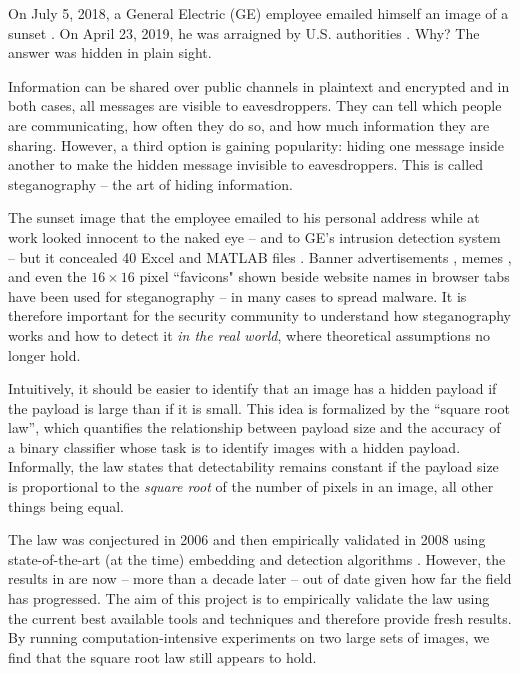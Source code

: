 \documentclass[11pt,a4paper,twoside,openright]{report}
\begin{document}
On July 5, 2018, a General Electric (GE) employee emailed himself an image of a sunset \cite{info-sec-ge}. On April 23, 2019, he was arraigned by U.S. authorities \cite{washington-post-ge}. Why? The answer was hidden in plain sight.

Information can be shared over public channels in plaintext and encrypted and in both cases, all messages are visible to eavesdroppers. They can tell which people are communicating, how often they do so, and how much information they are sharing. However, a third option is gaining popularity: hiding one message inside another to make the hidden message invisible to eavesdroppers. This is called steganography -- the art of hiding information.

The sunset image that the employee emailed to his personal address while at work looked innocent to the naked eye -- and to GE's intrusion detection system -- but it concealed 40 Excel and MATLAB files \cite{info-sec-ge}. Banner advertisements \cite{forbes-banner-ads}, memes \cite{trend-micro-memes}, and even the $16\times16$ pixel ``favicons" shown beside website names in browser tabs \cite{trend-micro-steganography} have been used for steganography -- in many cases to spread malware. It is therefore important for the security community to understand how steganography works and how to detect it \textit{in the real world}, where theoretical assumptions no longer hold.

Intuitively, it should be easier to identify that an image has a hidden payload if the payload is large than if it is small. This idea is formalized by the ``square root law'', which quantifies the relationship between payload size and the accuracy of a binary classifier whose task is to identify images with a hidden payload. Informally, the law states that detectability remains constant if the payload size is proportional to the \textit{square root} of the number of pixels in an image, all other things being equal.

The law was conjectured in 2006 \cite{batch-first-srl} and then empirically validated in 2008 using state-of-the-art (at the time) embedding and detection algorithms \cite{2008-paper}. However, the results in \cite{2008-paper} are now -- more than a decade later -- out of date given how far the field has progressed. The aim of this project is to empirically validate the law using the current best available tools and techniques and therefore provide fresh results. By running computation-intensive experiments on two large sets of images, we find that the square root law still appears to hold.
\end{document}
